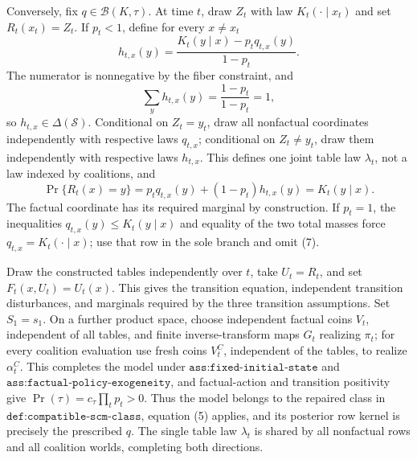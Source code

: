 Conversely, fix \(q\in\mathcal B(K,\tau)\).  At time \(t\), draw \(Z_t\) with law \(K_t(\cdot\mid x_t)\) and set \(R_t(x_t)=Z_t\).  If \(p_t<1\), define for every \(x\ne x_t\)
\[
 h_{t,x}(y)=\frac{K_t(y\mid x)-p_tq_{t,x}(y)}{1-p_t}. \tag{7}
\]
The numerator is nonnegative by the fiber constraint, and
\[
 \sum_y h_{t,x}(y)=\frac{1-p_t}{1-p_t}=1, \tag{8}
\]
so \(h_{t,x}\in\Delta(\mathcal S)\).  Conditional on \(Z_t=y_t\), draw all nonfactual coordinates independently with respective laws \(q_{t,x}\); conditional on \(Z_t\ne y_t\), draw them independently with respective laws \(h_{t,x}\).  This defines one joint table law \(\lambda_t\), not a law indexed by coalitions, and
\[
 \Pr\{R_t(x)=y\}=p_tq_{t,x}(y)+(1-p_t)h_{t,x}(y)=K_t(y\mid x). \tag{9}
\]
The factual coordinate has its required marginal by construction.  If \(p_t=1\), the inequalities \(q_{t,x}(y)\le K_t(y\mid x)\) and equality of the two total masses force \(q_{t,x}=K_t(\cdot\mid x)\); use that row in the sole branch and omit (7).

Draw the constructed tables independently over \(t\), take \(U_t=R_t\), and set \(F_t(x,U_t)=U_t(x)\).  This gives the transition equation, independent transition disturbances, and marginals required by the three transition assumptions.  Set \(S_1=s_1\).  On a further product space, choose independent factual coins \(V_t\), independent of all tables, and finite inverse-transform maps \(G_t\) realizing \(\pi_t\); for every coalition evaluation use fresh coins \(V_t^C\), independent of the tables, to realize \(\alpha_t^C\).  This completes the model under \(\texttt{ass:fixed-initial-state}\) and \(\texttt{ass:factual-policy-exogeneity}\), and factual-action and transition positivity give \(\Pr(\tau)=c_\tau\prod_t p_t>0\).  Thus the model belongs to the repaired class in \(\texttt{def:compatible-scm-class}\), equation (5) applies, and its posterior row kernel is precisely the prescribed \(q\).  The single table law \(\lambda_t\) is shared by all nonfactual rows and all coalition worlds, completing both directions.